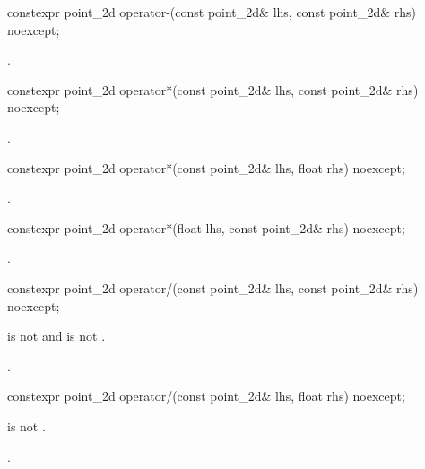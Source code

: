 %
\begin{itemdecl}
constexpr point_2d operator-(const point_2d& lhs, const point_2d& rhs) 
  noexcept;
\end{itemdecl}
\begin{itemdescr}
\pnum
\returns
{}.
\end{itemdescr}

%
\begin{itemdecl}
constexpr point_2d operator*(const point_2d& lhs, const point_2d& rhs) 
  noexcept;
\end{itemdecl}
\begin{itemdescr}
\pnum
\returns
{}.
\end{itemdescr}

%
\begin{itemdecl}
constexpr point_2d operator*(const point_2d& lhs, float rhs) noexcept;
\end{itemdecl}
\begin{itemdescr}
\pnum
\returns
{}.
\end{itemdescr}

%
\begin{itemdecl}
constexpr point_2d operator*(float lhs, const point_2d& rhs) noexcept;
\end{itemdecl}
\begin{itemdescr}
\pnum
\returns
{}.
\end{itemdescr}

%
\begin{itemdecl}
constexpr point_2d operator/(const point_2d& lhs, const point_2d& rhs) 
  noexcept;
\end{itemdecl}
\begin{itemdescr}
\pnum
\requires
{} is not  and  is not .

\pnum
\returns
{}.
\end{itemdescr}

%
\begin{itemdecl}
constexpr point_2d operator/(const point_2d& lhs, float rhs) noexcept;
\end{itemdecl}
\begin{itemdescr}
\pnum
\requires
{} is not .

\pnum
\returns
{}.
\end{itemdescr}

